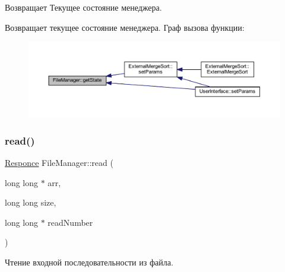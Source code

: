 \begin{DoxyReturn}{Возвращает}
Текущее состояние менеджера.
\end{DoxyReturn}
Возвращает текущее состояние менеджера. Граф вызова функции\+:\nopagebreak
\begin{figure}[H]
\begin{center}
\leavevmode
\includegraphics[width=350pt]{class_file_manager_abd4cbc2b218ab1828ae376a4a9137057_icgraph}
\end{center}
\end{figure}
\hypertarget{class_file_manager_aba031d681752c80f52a8a8af9b69834e}{}\label{class_file_manager_aba031d681752c80f52a8a8af9b69834e} 
\subsubsection{\texorpdfstring{read()}{read()}}
{\footnotesize\ttfamily \hyperlink{_structures_8h_a9864d6ef28dd6e38416afac4426b3491}{Responce} File\+Manager\+::read (\begin{DoxyParamCaption}\item[{long long $\ast$}]{arr,  }\item[{long long}]{size,  }\item[{long long $\ast$}]{read\+Number }\end{DoxyParamCaption})}



Чтение входной последовательности из файла. 


